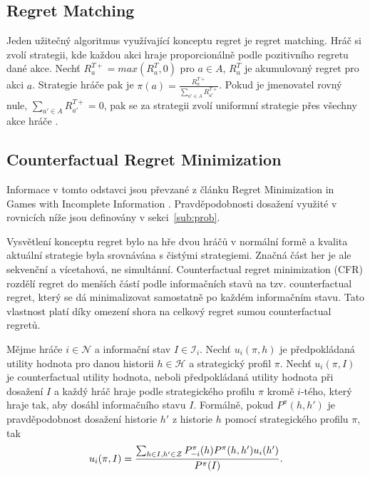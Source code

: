 \subsection{Regret Matching}

Jeden užitečný algoritmus využívající konceptu regret je regret matching. Hráč si zvolí strategii, kde každou akci hraje proporcionálně podle pozitivního regretu dané akce. Nechť $R^{T+}_a = max(R^T_a, 0)$ pro $a \in A$, $R^T_a$ je akumulovaný regret pro akci $a$. Strategie hráče pak je $\pi(a) = \frac{R^{T+}_a}{\sum_{a' \in A} R^{T+}_{a'}}$. Pokud je jmenovatel rovný nule, $\sum_{a' \in A} R^{T+}_{a'} = 0$, pak se za strategii zvolí uniformní strategie přes všechny akce hráče \cite{Schmid}.  

\subsection{Counterfactual Regret Minimization}\label{sub:cfr}
Informace v tomto odstavci jsou převzané z článku Regret Minimization in Games with Incomplete Information \cite{RegretInImperfectInformation}. Pravděpodobnosti dosažení využité v rovnicích níže jsou definovány v sekci~\ref{sub:prob}.

Vysvětlení konceptu regret bylo na hře dvou hráčů v normální formě a kvalita aktuální strategie byla srovnávána s čistými strategiemi. Značná část her je ale sekvenční a vícetahová, ne simultánní. Counterfactual regret minimization (CFR) rozdělí regret do menších částí podle informačních stavů na tzv. counterfactual regret, který se dá minimalizovat samostatně po každém informačním stavu. Tato vlastnost platí díky omezení shora na celkový regret sumou counterfactual regretů.

Mějme hráče $i \in \mathcal{N}$ a informační stav $I \in \mathcal{I}_i$. Nechť $u_i(\pi, h)$ je předpokládaná utility hodnota pro danou historii $h \in \mathcal{H}$ a strategický profil $\pi$. Nechť $u_i(\pi, I)$ je counterfactual utility hodnota, neboli předpokládaná utility hodnota při dosažení $I$ a každý hráč hraje podle strategického profilu $\pi$ kromě $i$-tého, který hraje tak, aby dosáhl informačního stavu $I$. Formálně, pokud $P^\pi(h, h')$ je pravděpodobnost dosažení historie $h'$ z historie $h$ pomocí strategického profilu $\pi$, tak 
\begin{equation}
    u_i(\pi, I) = \frac{\sum_{h \in I, h' \in \mathcal{Z}} P^\pi_{-i}(h)P^\pi(h, h')u_i(h')}{P^\pi(I)}
\hbox{.}\end{equation} 

